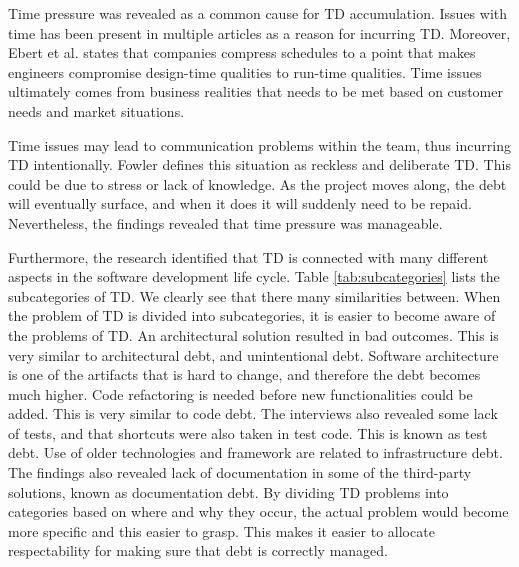 
Time pressure was revealed as a common cause for TD accumulation. Issues with time has been present in multiple articles as a reason for incurring TD\cite{p29-cunningham,foser076-brown,zazworka2011investigating,p8-codabux,p50-allman,lim-taksande}. Moreover, Ebert et al.\cite{ebert2009embedded} states that companies compress schedules to a point that makes engineers compromise design-time qualities to run-time qualities. Time issues ultimately comes from business realities that needs to be met based on customer needs and market situations. 

Time issues may lead to communication problems within the team, thus incurring TD intentionally. Fowler defines this situation as reckless and deliberate TD\cite{url-fowler}. This could be due to stress or lack of knowledge. As the project moves along, the debt will eventually surface, and when it does it will suddenly need to be repaid. Nevertheless, the findings revealed that time pressure was manageable.

Furthermore, the research identified that TD is connected with many different aspects in the software development life cycle. Table \ref{tab:subcategories} lists the subcategories of TD. We clearly see that there many similarities between. When the problem of TD is divided into subcategories, it is easier to become aware of the problems of TD. An architectural solution resulted in bad outcomes. This is very similar to architectural debt, and unintentional debt. Software architecture is one of the artifacts that is hard to change, and therefore the debt becomes much higher. Code refactoring is needed before new functionalities could be added. This is very similar to code debt\cite{li2015systematic}. The interviews also revealed some lack of tests, and that shortcuts were also taken in test code. This is known as test debt\cite{li2015systematic}. Use of older technologies and framework are related to infrastructure debt\cite{li2015systematic}. The findings also revealed lack of documentation in some of the third-party solutions, known as documentation debt\cite{li2015systematic}. By dividing TD problems into categories based on where and why they occur, the actual problem would become more specific and this easier to grasp. This makes it easier to allocate respectability for making sure that debt is correctly managed.

